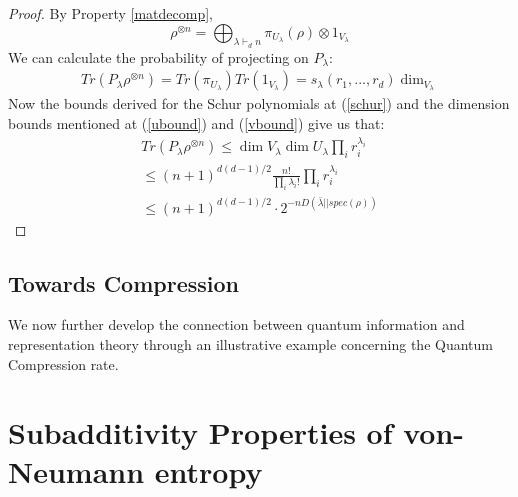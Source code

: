 \documentclass[12pt]{article}%
\begin{document}
\begin{proof}
 By Property \ref{matdecomp},
 $$ \rho^{\otimes n} = \bigoplus_{\lambda \vdash_d n} \pi_{U_\lambda}(\rho) \otimes 1_{V_\lambda}$$
 We can calculate the probability of projecting on $P_{\lambda}$:
 \begin{gather*}
   Tr(P_\lambda\rho^{\otimes n}) = Tr(\pi_{U_\lambda})Tr(1_{V_\lambda}) = s_{\lambda}(r_1,...,r_d)\dim_{V_\lambda}
 \end{gather*}
  Now the bounds derived for the Schur polynomials at (\ref{schur}) and the dimension bounds mentioned at (\ref{ubound}) and (\ref{vbound}) give us that:
  \begin{gather*}
    Tr(P_\lambda\rho^{\otimes n}) \leq \dim{V_\lambda}\dim{U_\lambda} \prod_{i} r_i^{\lambda_i} \\
    \leq (n+1)^{d(d-1)/2}\frac{n!}{\prod_i \lambda_i!} \prod_{i} r_i^{\lambda_i} \\
    \leq (n+1)^{d(d-1)/2}\cdot 2^{-n D(\bar{\lambda}||spec(\rho))}
  \end{gather*}
\end{proof}

\subsection{Towards Compression}
We now further develop the connection between quantum information and representation theory through an illustrative example concerning the Quantum Compression rate.


\section{Subadditivity Properties of von-Neumann entropy}



\end{document}
